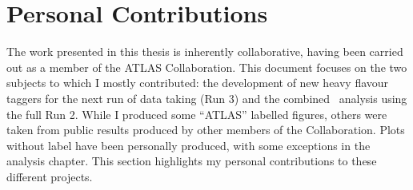 \chapter*{\color{oxfordblue} Personal Contributions}

The work presented in this thesis is inherently collaborative, having been carried out as a member of the ATLAS Collaboration. This document focuses on the two subjects to which I mostly contributed: the development of new heavy flavour taggers for the next run of data taking (Run 3) and the combined \vhbc\ analysis using the full Run 2. While I produced some ``ATLAS'' labelled figures, others were taken from public results produced by other members of the Collaboration. Plots without label have been personally produced, with some exceptions in the analysis chapter. This section highlights my personal contributions to these different projects.


